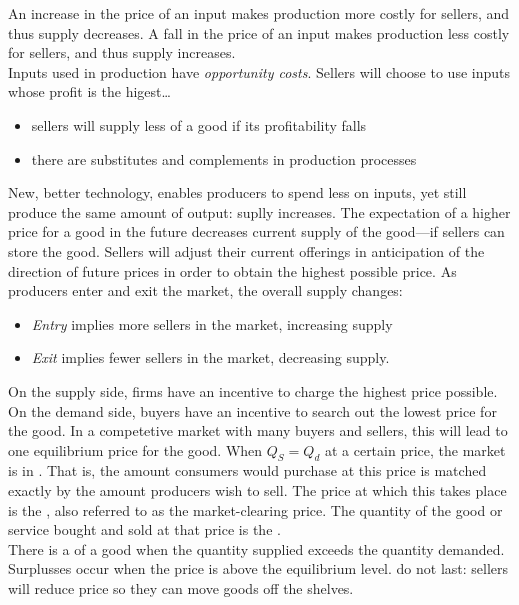 \documentclass{article}
\begin{document}
An increase in the price of an input makes production more costly for sellers, and thus supply decreases. A fall in the price of an input makes production less costly for sellers, and thus supply increases. \\ 

Inputs used in production have \emph{opportunity costs}. Sellers will choose to use inputs whose profit is the higest\dots 
\begin{itemize}
  \item sellers will supply less of a good if its profitability falls 
  \item there are substitutes and complements in production processes 
\end{itemize}

New, better technology, enables producers to spend less on inputs, yet still produce the same amount of output: suplly increases. The expectation of a higher price for a good in the future decreases current supply of the good---if sellers can store the good. Sellers will adjust their current offerings in anticipation of the direction of future prices in order to obtain the highest possible price. As producers enter and exit the market, the overall supply changes:
\begin{itemize}
  \item \emph{Entry} implies more sellers in the market, increasing supply
  \item \emph{Exit} implies fewer sellers in the market, decreasing supply. 
\end{itemize}
On the supply side, firms have an incentive to charge the highest price possible. On the demand side, buyers have an incentive to search out the lowest price for the good. In a competetive market with many buyers and sellers, this will lead to one equilibrium price for the good. When $Q_S = Q_d$ at a certain price, the market is in . That is, the amount consumers would purchase at this price is matched exactly by the amount producers wish to sell. The price at which this takes place is the , also referred to as the market-clearing price. The quantity of the good or service bought and sold at that price is the . \\ 

There is a  of a good when the quantity supplied exceeds the quantity demanded. Surplusses occur when the price is above the equilibrium level.  do not last: sellers will reduce price so they can move goods off the shelves. \\ 
\end{document}
